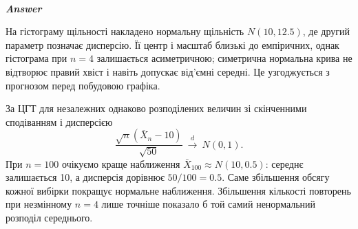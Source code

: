 \documentclass[11pt]{article}
\begin{document}
    \begin{center}
    \end{center}
    { \hspace*{\fill} \\}
    
    \textbf{\emph{Answer}}

На гістограму щільності накладено нормальну щільність \(N(10,12.5)\), де
другий параметр позначає дисперсію. Її центр і масштаб близькі до
емпіричних, однак гістограма при \(n=4\) залишається асиметричною;
симетрична нормальна крива не відтворює правий хвіст і навіть допускає
від'ємні середні. Це узгоджується з прогнозом перед побудовою графіка.

За ЦГТ для незалежних однаково розподілених величин зі скінченними
сподіванням і дисперсією
\[\frac{\sqrt n(\bar X_n-10)}{\sqrt{50}}\ \xrightarrow{d}\ N(0,1).\] При
\(n=100\) очікуємо краще наближення \(\bar X_{100}\approx N(10,0.5)\):
середнє залишається 10, а дисперсія дорівнює \(50/100=0.5\). Саме
збільшення обсягу кожної вибірки покращує нормальне наближення.
Збільшення кількості повторень при незмінному \(n=4\) лише точніше
показало б той самий ненормальний розподіл середнього.


    
    
    
\end{document}
